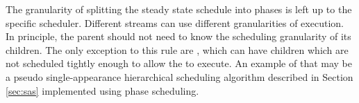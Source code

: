 \begin{comment}
The schedules created using single appearance hierarchical
scheduling tend to be quite small at the expense of larger
buffering requirements.  A quite simple situation when such
tradeoff is not desired, could be if the schedule is being stored
in a large cheap ROM device, while the RAM used for buffering data
is more expensive.  It is also quite possible that latency
constraints cannot be satisfied by a single appearance
hierarchical schedule. Clearly, a more flexible technique is
required for scheduling.

A key observation in hierarchical scheduling is that each
component only needs to worry about the data that enters or leaves
its children.  The amount of buffering done internally in a child
is not noticeable or important to the parent component. This
observation changes slightly if latency constraints are placed on
the computation. Namely, the important information to keep track
of is amount of data that leaves or enters children as well as
amount of data that crosses latency constraint boundaries.

This observation leads to a conclusion that scheduling execution
of the {\StreamIt} programs using hierarchical scheduling can be
simpler than scheduling the entire program all at once (scheduling
the program all at once requires tracking all buffers and latency
constraints at once).  Phased scheduling is a concept that expends
on hierarchical scheduling, but does not require that a stream has
a single or pseudo single appearance schedule.  Each stream is
allowed to have multiple sub-schedules, also called phases. Each
phase consists of phases of the children of the stream that will
be executed to execute the phase. The phases must be executed in
correct order. When all of the initialization phases of a stream
have been executed, the stream has executed its initialization
schedule and is ready to enter steady state execution. When all of
the steady state phases of a stream have been executed in order,
the entire steady state schedule for the stream has been executed.
\end{comment}

The granularity of splitting the steady state schedule into phases
is left up to the specific scheduler.  Different streams can use
different granularities of execution.  In principle, the parent
should not need to know the scheduling granularity of its
children. The only exception to this rule are {{\feedbackloops}},
which can have children which are not scheduled tightly enough to
allow the {{\feedbackloop}} to execute. An example of that may be a
pseudo single-appearance hierarchical scheduling algorithm
described in Section \ref{sec:sas} implemented using phase
scheduling.


